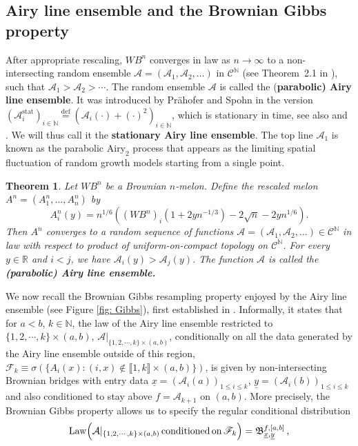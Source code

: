 \documentclass[11pt, reqno]{amsart}
\numberwithin{equation}{section}
\newcounter{dummy} \numberwithin{dummy}{section}
\newtheorem{theorem}[dummy]{Theorem}
\newcommand{\N}{\ensuremath{\mathbb{N}}}
\begin{document}
\subsection{Airy line ensemble and the Brownian Gibbs property}\label{subsec: Airy line ensemble}
After appropriate rescaling, $WB^n$ converges in law as $n\to \infty$ to a non-intersecting random
ensemble \(\mathcal{A} = (\mathcal{A}_1, \mathcal{A}_2, \dots)\) in $\mathscr{C}^{\N}$ (see Theorem~2.1 in \cite{DOV}), such that $\mathcal{A}_1 > \mathcal{A}_2 > \cdots$. The random ensemble $\mathcal{A}$ is called the (\textbf{parabolic)
Airy line ensemble}. It was introduced by Pr\"{a}hofer and Spohn \cite{prahofer2002scale} in the version \((\mathcal{A}^{\mathrm{stat}}_i)_{i\in \N}\stackrel{\mathrm{def}}{=}(\mathcal{A}_i(\cdot)+(\cdot)^2)_{i\in \N}\), which is stationary
in time, see also \cite{corwin2014brownian} and \cite{corwin2014ergodicity}. We will thus call it the \textbf{stationary Airy line ensemble}. The top line $\mathcal{A}_1$ is known as the parabolic $\text{Airy}_2$ process that appears as the
limiting spatial fluctuation of random growth models starting from a single point.

\begin{theorem}\label{thm: melon scaling Airy}
    Let \(WB^n\)  be a Brownian \(n\)-melon.  Define the rescaled melon \(A^n = (A^n_1, \dots, A^n_n)\) by
\begin{equation*}
A^n_i(y) = n^{1/6} \left((WB^n)_i(1 + 2yn^{-1/3}) - 2\sqrt{n} - 2yn^{1/6} \right).
\end{equation*}
Then \(A^n\) converges to a random sequence of functions \(\mathcal{A} = (\mathcal{A}_1, \mathcal{A}_2, \dots) \in \mathscr{C}^\mathbb{N}\) in law with respect to product of uniform-on-compact topology on \(\mathscr{C}^\mathbb{N}\). For every \(y \in \mathbb{R}\) and \(i < j\), we have \(\mathcal{A}_i(y) > \mathcal{A}_j(y)\). The function \(\mathcal{A}\) is called the \textbf{(parabolic) Airy line ensemble.} 
\end{theorem}%

We now recall the Brownian Gibbs resampling property enjoyed by the Airy line ensemble (see Figure \ref{fig: Gibbs}), first established in \cite{corwin2014brownian}. Informally, it states that for $a< b$, $k\in \N$, the law of the Airy line ensemble restricted to $\{1,2,\cdots,k\}\times(a,b)$, ${\mathcal{A}}|_{\{1,2,\cdots,k\}\times(a,b)}$, conditionally on all the data generated by the Airy line ensemble outside of this region, $\mathscr{F}_k\equiv \sigma(\{A_i(x): (i,x)\notin \llbracket 1,k\rrbracket \times (a,b)\})$, is given by non-intersecting Brownian bridges with entry data $\underline{x} = (\mathcal{A}_i(a))_{1\leq i\leq k}$, $\underline{y} = (\mathcal{A}_i(b))_{1\leq i\leq k}$ and also conditioned to stay above $f = \mathcal{A}_{k+1}$ on $(a,b)$. More precisely, the Brownian Gibbs property allows us to specify the regular conditional distribution
\begin{equation*}
\mathrm{Law}\Bigl(\mathbf{\mathcal{A}}|_{\{1,2,\cdots,k\}\times(a,b)}\, \mathrm{ conditioned\, on }\, \mathscr{F}_k\Bigr) = \mathfrak{B}_{\underline{x},\underline{y}}^{f, [a,b]}\,,
\end{equation*}
\end{document}
